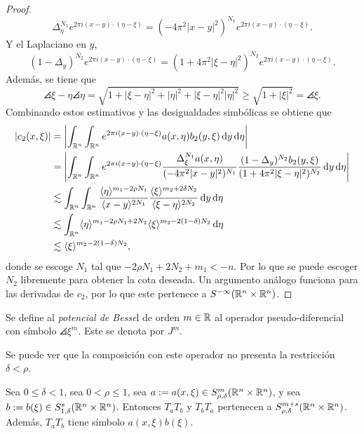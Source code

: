 \begin{proof}
	\begin{equation*}
		\Delta_\eta^{N_1} e^{2\pi i(x-y)\cdot(\eta-\xi)} = 
		(- 4\pi^2|x-y|^2)^{N_1}  e^{2\pi i(x-y)\cdot(\eta-\xi)}.
	\end{equation*}
	Y el Laplaciano en $y$,
	\begin{equation*}
		(1-\Delta_y)^{N_2} e^{2\pi i(x-y)\cdot(\eta-\xi)}  = 
		(1+4\pi^2|\xi-\eta|^2)^{N_2} e^{2\pi i(x-y)\cdot(\eta-\xi)}.
	\end{equation*}
	Además, se tiene que 
	\begin{equation*}
		\angles{\xi-\eta}\angles{\eta} = \sqrt{1 + |\xi-\eta|^2 + |\eta|^2 + |\xi-\eta|^2|\eta|^2} \geq \sqrt{1 + |\xi|^2} = \angles{\xi}.
	\end{equation*}
	Combinando estos estimativos y las desigualdades simbólicas se obtiene que
	\begin{align*}
		|c_2(x, \xi)| & = \left| \int_{\mathbb{R}^n}\int_{\mathbb{R}^n} 
		e^{2\pi i(x-y)\cdot(\eta-\xi)} a(x, \eta)b_2(y, \xi)\mathop{}\!\mathrm{d} y \mathop{}\!\mathrm{d} \eta \right| \\
		&  = \left| \int_{\mathbb{R}^n}\int_{\mathbb{R}^n} 
		e^{2\pi i(x-y)\cdot(\eta-\xi)} \frac{\Delta_\xi^{N_1}a(x, \eta)}{(-4\pi^2|x-y|^2)^{N_1}} \frac{(1-\Delta_y)^{N_2}b_2(y, \xi)}{(1+4\pi^2|\xi-\eta|^2)^{N_2}}\mathop{}\!\mathrm{d} y \mathop{}\!\mathrm{d} \eta \right|  \\
		& \lesssim \int_{\mathbb{R}^n}\int_{\mathbb{R}^n}  \frac{\langle\eta\rangle^{m_1-2\rho N_1}}{\langle x-y\rangle^{2N_1}} \frac{\langle\xi\rangle^{m_2 + 2\delta N_2}}{\langle\xi-\eta\rangle^{2N_2}} \mathop{}\!\mathrm{d} y \mathop{}\!\mathrm{d} \eta \\
		& \lesssim \int_{\mathbb{R}^n} \langle\eta\rangle^{m_1-2\rho N_1 + 2N_2} \langle\xi\rangle^{m_2-2(1-\delta) N_2 } \mathop{}\!\mathrm{d} \eta \\
		& \lesssim \langle\xi\rangle^{m_2-2(1-\delta) N_2 }, \\
	\end{align*}
	donde se escoge $N_1$ tal que $-2\rho N_1 + 2N_2 + m_1 < -n$. Por lo que se puede escoger $N_2$ libremente para obtener la cota deseada. Un argumento análogo funciona para las derivadas de $c_2$, por lo que este pertenece a $S^{-\infty}(\mathbb{R}^n\times\mathbb{R}^n)$.
\end{proof}
\begin{definition}
	Se define al \textit{potencial de Besse}l de orden $m\in\mathbb{R}$ al operador pseudo-diferencial con símbolo $\angles{\xi}^m$. Este se denota por $J^m$.
\end{definition}
Se puede ver que la composición con este operador no presenta la restricción $\delta<\rho$.
\begin{theorem}
	Sea $0\leq\delta<1$, sea $0<\rho\leq1$, sea $a:=a(x, \xi)\in S^m_{\rho,\delta}(\mathbb{R}^n\times\mathbb{R}^n)$, y sea $b:=b(\xi) \in S^s_{1,\delta}(\mathbb{R}^n\times\mathbb{R}^n)$. Entonces $T_aT_b$ y $T_bT_a$ pertenecen a $S^{m+s}_{\rho,\delta}(\mathbb{R}^n\times\mathbb{R}^n)$. Además, $T_aT_b$ tiene símbolo $a(x, \xi)b(\xi)$.
\end{theorem}
